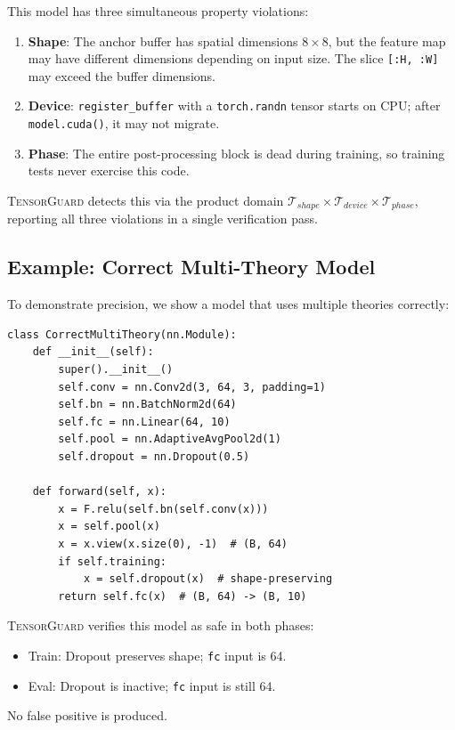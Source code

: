 \documentclass[10pt]{article}
\newcommand{\tguard}{\textsc{TensorGuard}}
\newcommand{\Tshape}{\mathcal{T}_{\mathit{shape}}}
\newcommand{\Tdevice}{\mathcal{T}_{\mathit{device}}}
\newcommand{\Tphase}{\mathcal{T}_{\mathit{phase}}}
\theoremstyle{plain}
\theoremstyle{definition}
\theoremstyle{remark}
\begin{document}
This model has three simultaneous property violations:
\begin{enumerate}[nosep]
  \item \textbf{Shape}: The anchor buffer has spatial dimensions
    $8 \times 8$, but the feature map may have different dimensions
    depending on input size.  The slice \texttt{[:H, :W]} may exceed
    the buffer dimensions.
  \item \textbf{Device}: \texttt{register\_buffer} with a
    \texttt{torch.randn} tensor starts on CPU; after
    \texttt{model.cuda()}, it may not migrate.
  \item \textbf{Phase}: The entire post-processing block is dead
    during training, so training tests never exercise this code.
\end{enumerate}

\tguard{} detects this via the product domain
$\Tshape \times \Tdevice \times \Tphase$, reporting all three
violations in a single verification pass.

\subsection{Example: Correct Multi-Theory Model}

To demonstrate precision, we show a model that uses multiple theories
correctly:

\begin{lstlisting}[caption={Correct model using device transfer,
  phase-conditional behavior, and complex shape transformations.},
  label={lst:correct}]
class CorrectMultiTheory(nn.Module):
    def __init__(self):
        super().__init__()
        self.conv = nn.Conv2d(3, 64, 3, padding=1)
        self.bn = nn.BatchNorm2d(64)
        self.fc = nn.Linear(64, 10)
        self.pool = nn.AdaptiveAvgPool2d(1)
        self.dropout = nn.Dropout(0.5)

    def forward(self, x):
        x = F.relu(self.bn(self.conv(x)))
        x = self.pool(x)
        x = x.view(x.size(0), -1)  # (B, 64)
        if self.training:
            x = self.dropout(x)  # shape-preserving
        return self.fc(x)  # (B, 64) -> (B, 10)
\end{lstlisting}

\tguard{} verifies this model as safe in both phases:
\begin{itemize}[nosep]
  \item Train: Dropout preserves shape; \texttt{fc} input is 64.
  \item Eval: Dropout is inactive; \texttt{fc} input is still 64.
\end{itemize}
No false positive is produced.
\end{document}
